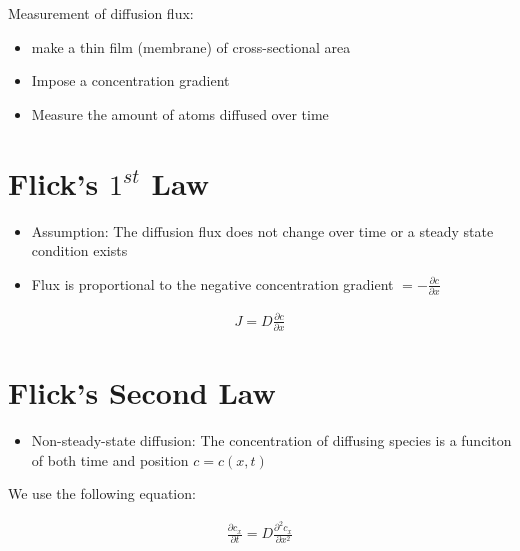 \documentclass{article}
\begin{document}
Measurement of diffusion flux:
\begin{itemize}
    \item make a thin film (membrane) of cross-sectional area
    \item Impose a concentration gradient
    \item Measure the amount of atoms diffused over time
\end{itemize}

\section{Flick's $1^{st}$ Law}
\begin{itemize}
    \item Assumption: The diffusion flux does not change over time or a steady state condition exists
    \item Flux is proportional to the negative concentration gradient $=-\frac{\partial c}{\partial x} $
\end{itemize}

\begin{equation}
    \begin{split}
        J = D\frac{\partial c}{\partial x}
    \end{split}
\end{equation}

\section{Flick's Second Law}

\begin{itemize}
    \item Non-steady-state diffusion: The concentration of diffusing species is a funciton of both time and position $c = c(x,t)$
\end{itemize}

We use the following equation:

\begin{equation}
    \begin{split}
        \frac{\partial c_x}{\partial t} = D \frac{\partial^2 c_x}{\partial x^2}
    \end{split}
\end{equation}
\end{document}
